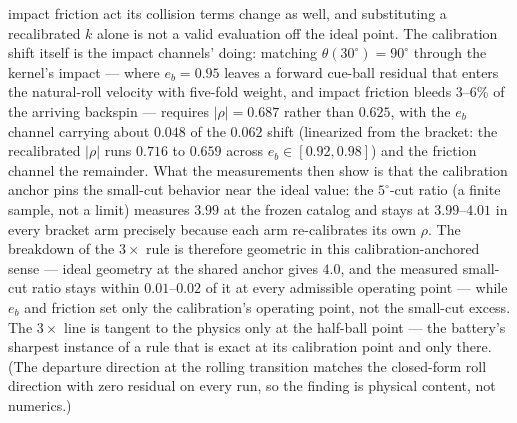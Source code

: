 impact friction act its collision terms change as well, and
substituting a recalibrated $k$ alone is not a valid evaluation off the
ideal point. The calibration shift itself is the impact channels'
doing: matching $\theta(30^\circ) = 90^\circ$
through the kernel's impact --- where $e_b = 0.95$ leaves a forward
cue-ball residual that enters the natural-roll velocity with five-fold
weight, and impact friction bleeds 3--6\% of the arriving backspin ---
requires $|\rho| = 0.687$ rather than $0.625$, with the $e_b$ channel
carrying about $0.048$ of the $0.062$ shift (linearized from the
bracket: the recalibrated $|\rho|$ runs $0.716$ to $0.659$ across
$e_b \in [0.92, 0.98]$) and the friction channel the remainder. What
the measurements then show is that the calibration anchor pins the
small-cut behavior near the ideal value: the $5^\circ$-cut ratio (a
finite sample, not a limit) measures $3.99$ at the frozen catalog and
stays at $3.99$--$4.01$ in every bracket arm precisely because
each arm re-calibrates its own $\rho$. The breakdown of the $3\times$
rule is therefore geometric in this calibration-anchored sense ---
ideal geometry at the shared anchor gives $4.0$, and the measured
small-cut ratio stays within $0.01$--$0.02$ of it at every admissible
operating point --- while $e_b$ and friction set only the calibration's
operating point, not the small-cut excess. The
$3\times$ line is tangent to the physics only at the half-ball point ---
the battery's sharpest instance of a rule that is exact at its
calibration point and only there. (The departure direction at the rolling
transition matches the closed-form roll direction with zero residual on
every run, so the finding is physical content, not numerics.)

